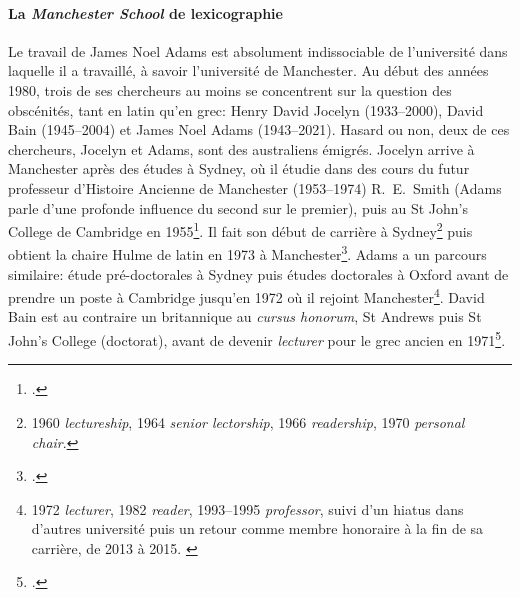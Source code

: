 \paragraph{La \textit{Manchester School} de lexicographie}

Le travail de James Noel Adams est absolument indissociable de l'université dans laquelle il a travaillé, à savoir l'université de Manchester. Au début des années 1980, trois de ses chercheurs au moins se concentrent sur la question des obscénités, tant en latin qu'en grec: Henry David Jocelyn (1933--2000), David Bain (1945--2004) et James Noel Adams (1943--2021). Hasard ou non, deux de ces chercheurs, Jocelyn et Adams, sont des australiens émigrés. Jocelyn arrive à Manchester après des études à Sydney, où il étudie dans des cours du futur professeur d'Histoire Ancienne de Manchester (1953--1974) R.~E.~Smith (Adams parle d'une profonde influence du second sur le premier), puis au St John's College de Cambridge en 1955\footcite[p.~281--282]{adams_henry_2003}. Il fait son début de carrière à Sydney\footnote{1960 \textit{lectureship}, 1964 \textit{senior lectorship}, 1966 \textit{readership}, 1970 \textit{personal chair}.} puis obtient la chaire Hulme de latin en 1973 à Manchester\footcite[p.~286]{adams_henry_2003}. Adams a un parcours similaire: étude pré-doctorales à Sydney puis études doctorales à Oxford avant de prendre un poste à Cambridge jusqu'en 1972 où il rejoint Manchester\footnote{1972 \textit{lecturer}, 1982 \textit{reader}, 1993--1995 \textit{professor}, suivi d'un hiatus dans d'autres université puis un retour comme membre honoraire à la fin de sa carrière, de 2013 à 2015. \textcite{adams_page_carreer}}. David Bain est au contraire un britannique au \textit{cursus honorum}, St Andrews puis St John's College (doctorat), avant de devenir \textit{lecturer} pour le grec ancien en 1971\footcite{bain_obituary}. 

